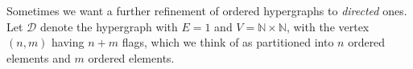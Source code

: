 \documentclass{article}
\newtheorem{lem}[thm]{Lemma}
\newtheorem{cor}[thm]{Corollary}
\theoremstyle{definition}
\theoremstyle{remark}
\let\setof\Set
\def\Set{\mathbf{Set}}
\newcounter{nodemaker}
\newcommand{\twocell}[2][]{%
  \global\edef\mynodeone{twocell\arabic{nodemaker}}%
  \stepcounter{nodemaker}%
  \global\edef\mynodetwo{twocell\arabic{nodemaker}}%
  \stepcounter{nodemaker}%
  \ar[#2,phantom,shift left=3,""{name=\mynodeone}]%
  \ar[#2,phantom,shift right=3,""'{name=\mynodetwo}]%
  \ar[Rightarrow,from=\mynodeone,to=\mynodetwo,"{#1}"]%
}
\let\ot\leftarrow
\let\xto\xrightarrow
\def\N{\mathbb{N}}
\def\Np{\N_{\bullet}}
\def\hy{\mathbf{HyGph}}
\def\RGph{\mathbf{RGph}}
\def\thy{\mathcal{T}}
\def\dhy{\mathcal{D}}
\begin{document}
\begin{comment}
Ordered hypergraphs have another convenient description.
Let $\Np$ be the set $\setof{(k,n) \in \N\times \N | k<n}$, with $\ell:\Np\to \N$ the second projection.
Thus the fiber of $\ell$ over $n\in\N$ is the canonical $n$-element linear order, and we can write $\thy = (\N \ot \Np \to 1)$.

Let $P_\ell$ be the polynomial endofunctor of $\Set$ defined by $\ell$, i.e.\ the composite
\[ \Set \xto{(\Np)^*} \Set/\Np \xto{\Pi_\ell} \Set/\N \xto{\Sigma_\N} \Set.\]
Thus an element of $P_\ell(E)$ is a finite list of elements of $E$.

Let $\RGph$ denote the category of reflexive directed graphs, with $U:\RGph\to\Set$ the functor taking the underlying set of vertices.

\begin{lem}
  The category $\hy/\thy$ of ordered hypergraphs is equivalent to the comma category
  \[
  \begin{tikzcd}
    \hy \ar[rr] \ar[d] \twocell{drr} && \Set \ar[d,equals] \\
    \RGph \ar[r,"U"'] & \Set \ar[r,"P_\ell"'] & \Set.
  \end{tikzcd}
  \]
\end{lem}
\begin{proof}
  An object of the comma category consists of a reflexive graph $E$ together with a set $V$ and a map $V \to P_\ell U E$.
  By definition of $P_\ell$, the latter map is equivalent to a map $f:V\to \N$ together with a map $f^*\Np \to UE$.
  This is exactly the data of a hypergraph $V \ot f^*\Np \to E$ equipped with a hypergraph map to $\thy = (\N \ot\Np \to 1)$.
\end{proof}

\begin{cor}
  $\hy/\thy$ is a presheaf topos.
  In particular, it is complete and cocomplete.
\end{cor}
\begin{proof}
  The functor $P_\ell \circ U : \RGph \to \Set$ is a parametric right adjoint, since $P_\ell$ is a polynomial functor and $U$ is a right adjoint.
  Thus, since $\RGph$ is a presheaf topos, by~\cite{cj:clfrag} $\hy/\thy$ is again a presheaf topos.
\end{proof}
\end{comment}

Sometimes we want a further refinement of ordered hypergraphs to \emph{directed} ones.
Let $\dhy$ denote the hypergraph with $E=1$ and $V=\N\times \N$, with the vertex $(n,m)$ having $n+m$ flags, which we think of as partitioned into $n$ ordered elements and $m$ ordered elements.
\end{document}
